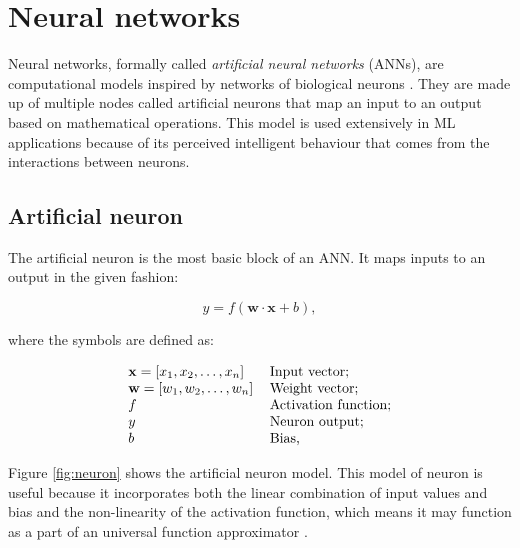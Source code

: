 \section{Neural networks}

Neural networks, formally called \emph{artificial neural networks} (ANNs), are computational models inspired by networks of biological neurons \cite{Puri2016}. They are made up of multiple nodes called artificial neurons that map an input to an output based on mathematical operations. This model is used extensively in ML applications because of its perceived intelligent behaviour that comes from the interactions between neurons.

\subsection{Artificial neuron}

The artificial neuron is the most basic block of an ANN. It maps inputs to an output in the given fashion:

\begin{equation} \label{eq:neuron_eq}
	y = f(\mathbf{w} \cdot \mathbf{x} + b),
\end{equation}

where the symbols are defined as:

\begin{equation} \label{eq:neuron_symbols}
	\begin{tabular}{ll}
		$\mathbf{x} = [x_1, x_2, \ldots, x_n]$ & Input vector;\\
		$\mathbf{w} = [w_1, w_2, \ldots, w_n]$ & Weight vector;\\
		$f$ & Activation function; \\
		$y$ & Neuron output; \\
		$b$ & Bias,
	\end{tabular}
\end{equation}

Figure \ref{fig:neuron} shows the artificial neuron model. This model of neuron is useful because it incorporates both the linear combination of input values and bias and the non-linearity of the activation function, which means it may function as a part of an universal function approximator \cite{HORNIK1989}.

